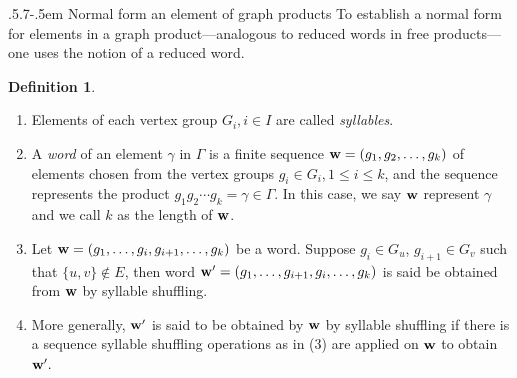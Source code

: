 \documentclass[11pt,reqno]{amsart}
\makeatletter
\numberwithin{equation}{section} %
\theoremstyle{definition}
\newtheorem{defn}{Definition}
\theoremstyle{remark}
\numberwithin{equation}{section}
\def\subsection{\def\@secnumfont{\bfseries}\@startsection{subsection}{2}%
  {\parindent}{.5\linespacing\@plus.7\linespacing}{-.5em}%
  {\normalfont\bfseries}}
\makeatother
\begin{document}
\subsection{Normal form an element of graph products}
To establish a normal form for elements in a graph product—analogous to reduced 
words in free products—one uses the notion of a reduced word.

\begin{defn} 
    \begin{enumerate}
        \item Elements of each vertex group $G_i, i\in I$ are called \emph{syllables}.
        \item  A \emph{word} of an element $\gamma$ in $\Gamma$ is a finite sequence 
$\bold w = (g_1, g_2, \dots, g_k)$ of elements chosen from the vertex groups $g_i\in G_i, 1\le i\le k$, and  the sequence represents the product 
$g_1 g_2 \cdots g_k=\gamma \in \Gamma$. In this case, we say $\bold w$ represent $\gamma$ and we call $k$ as the length of $\bold w$.
\item Let $\bold w = (g_1, \dots,g_i, g_{i+1}, \dots, g_k)$ be a word. Suppose $g_i\in G_u$, $g_{i+1}\in G_v$ such that $\{u, v\}\notin E$, then word $\bold w' =  (g_1, \dots, g_{i+1}, g_i, \dots, g_k)$ is said be obtained from $\bold w$ by
 syllable shuffling. 
 \item More generally, $\bold w'$ is said to be obtained by $\bold w$ by  syllable shuffling if there is a sequence syllable shuffling operations as in (3) are applied on $\bold w$ to obtain $\bold w'.$
    \end{enumerate} 
\end{defn}
\end{document}
